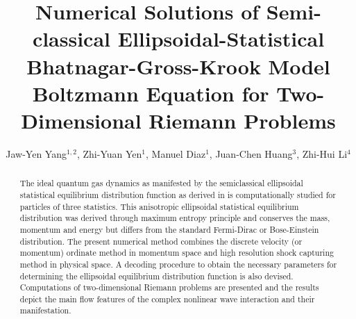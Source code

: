 \documentclass{rsproca}%
\begin{document}
\title{Numerical Solutions of Semi-classical Ellipsoidal-Statistical Bhatnagar-Gross-Krook Model Boltzmann Equation for Two-Dimensional Riemann Problems}

\author{%
Jaw-Yen Yang$^{1,2}$, Zhi-Yuan Yen$^{1}$, Manuel Diaz$^{1}$, Juan-Chen Huang$^{3}$, Zhi-Hui Li$^{4}$}

\address{$^{1}$Institute of Applied Mechanics, National Taiwan University, Taipei 10764, TAIWAN\\
$^{2}$Center of Quantum Science and Engineering, National Taiwan University, Taipei 10764, TAIWAN\\
$^{3}$Department of Merchant, National Taiwan Ocean University, Taipei 10764, TAIWAN\\
$^{4}$China Aerodynamics Research and Development Center, Mianyang, 10764, CHINA}


\subject{Mesoscopic Methods, Semi-classical Botlzmann Transport, Ellipsoidal Statistics, Kinetic Theory, Quantum shock waves}



\begin{abstract}
The ideal quantum gas dynamics as manifested by the semiclassical ellipsoidal statistical equilibrium distribution function as derived in \cite{Wu2012} is computationally studied for particles of three statistics.  This anisotropic ellipsoidal statistical equilibrium distribution was derived through maximum entropy principle and conserves the mass, momentum and energy but differs from the standard Fermi-Dirac or Bose-Einstein distribution. The present numerical method combines the discrete velocity (or momentum) ordinate method in momentum space and high resolution shock capturing method in physical space.   A decoding procedure to obtain the necessary parameters for determining the ellipsoidal equilibrium distribution function is also devised.  Computations of two-dimensional Riemann problems are presented and the results depict the main flow features of the complex nonlinear wave interaction and their manifestation.
\end{abstract}
\end{document}
